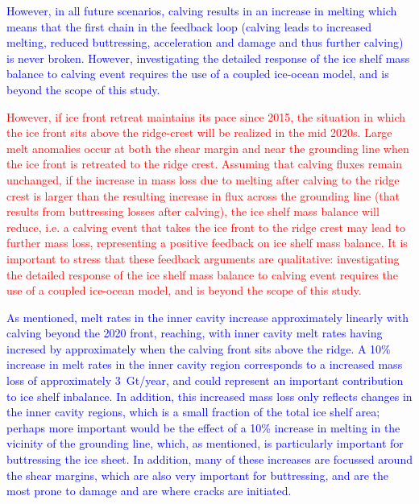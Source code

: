 \documentclass[draft]{agujournal2019}
\newcommand{\red}[1]{\textcolor{red}{#1}}
\newcommand{\blue}[1]{\textcolor{blue}{#1}}
\begin{document}
\blue{However, in all future scenarios, calving results in an increase in melting which means that the first chain in the feedback loop (calving leads to increased melting, reduced buttressing, acceleration and damage and thus further calving) is never broken. However, investigating the detailed response of the ice shelf mass balance to calving event requires the use of a coupled ice-ocean model, and is beyond the scope of this study.} 


\red{However, if ice front retreat maintains its pace since 2015, the situation in which the ice front sits above the ridge-crest will be realized in the mid 2020s. Large melt anomalies occur at both the shear margin and near the grounding line when the ice front is retreated to the ridge crest. Assuming that calving fluxes remain unchanged, if the increase in mass loss due to melting after calving to the ridge crest is larger than the resulting increase in flux across the grounding line (that results from buttressing losses after calving), the ice shelf mass balance will reduce, i.e. a calving event that takes the ice front to the ridge crest may lead to further mass loss, representing a positive feedback on ice shelf mass balance. It is important to stress that these feedback arguments are qualitative: investigating the detailed response of the ice shelf mass balance to calving event requires the use of a coupled ice-ocean model, and is beyond the scope of this study.}

\blue{As mentioned, melt rates in the inner cavity increase approximately linearly with calving beyond the 2020 front, reaching, with inner cavity melt rates having incresed by approximately when the calving front sits above the ridge. A 10\% increase in melt rates in the inner cavity region corresponds to a increased mass loss of approximately 3~Gt/year, and could represent an important contribution to ice shelf inbalance. In addition, this increased mass loss only reflects changes in the inner cavity regions, which is a small fraction of the total ice shelf area; perhaps more important would be the effect of a 10\% increase in melting in the vicinity of the grounding line, which, as mentioned, is particularly important for buttressing the ice sheet. In addition, many of these increases are focussed around the shear margins, which are also very important for buttressing, and are the most prone to damage and are where cracks are initiated. }


\end{document}
